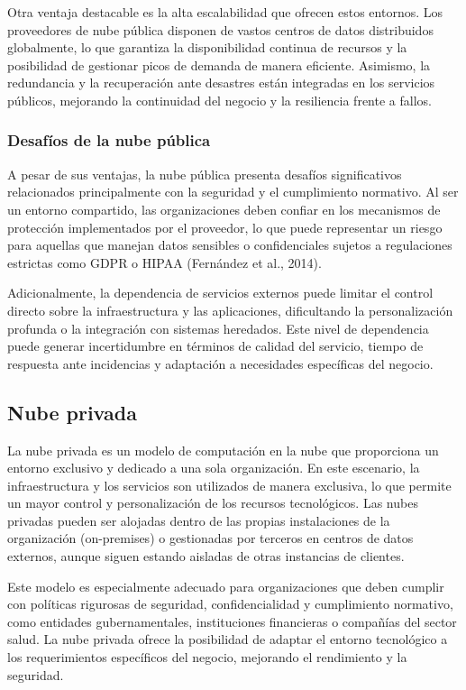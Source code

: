 {                Otra ventaja destacable es la alta escalabilidad que ofrecen estos entornos. Los proveedores de nube p{\'u}blica disponen de vastos centros de datos distribuidos globalmente, lo que garantiza la disponibilidad continua de recursos y la posibilidad de gestionar picos de demanda de manera eficiente. Asimismo, la redundancia y la recuperaci{\'o}n ante desastres est{\'a}n integradas en los servicios p{\'u}blicos, mejorando la continuidad del negocio y la resiliencia frente a fallos.
                
            \subsubsection{Desaf{\'i}os de la nube p{\'u}blica}
                A pesar de sus ventajas, la nube p{\'u}blica presenta desaf{\'i}os significativos relacionados principalmente con la seguridad y el cumplimiento normativo. Al ser un entorno compartido, las organizaciones deben confiar en los mecanismos de protecci{\'o}n implementados por el proveedor, lo que puede representar un riesgo para aquellas que manejan datos sensibles o confidenciales sujetos a regulaciones estrictas como GDPR o HIPAA (Fern{\'a}ndez et al., 2014).
                
                Adicionalmente, la dependencia de servicios externos puede limitar el control directo sobre la infraestructura y las aplicaciones, dificultando la personalizaci{\'o}n profunda o la integraci{\'o}n con sistemas heredados. Este nivel de dependencia puede generar incertidumbre en t{\'e}rminos de calidad del servicio, tiempo de respuesta ante incidencias y adaptaci{\'o}n a necesidades espec{\'i}ficas del negocio.

        \subsection{Nube privada}
            La nube privada es un modelo de computaci{\'o}n en la nube que proporciona un entorno exclusivo y dedicado a una sola organizaci{\'o}n. En este escenario, la infraestructura y los servicios son utilizados de manera exclusiva, lo que permite un mayor control y personalizaci{\'o}n de los recursos tecnol{\'o}gicos. Las nubes privadas pueden ser alojadas dentro de las propias instalaciones de la organizaci{\'o}n (on-premises) o gestionadas por terceros en centros de datos externos, aunque siguen estando aisladas de otras instancias de clientes.
            
            Este modelo es especialmente adecuado para organizaciones que deben cumplir con pol{\'i}ticas rigurosas de seguridad, confidencialidad y cumplimiento normativo, como entidades gubernamentales, instituciones financieras o compañ{\'i}as del sector salud. La nube privada ofrece la posibilidad de adaptar el entorno tecnol{\'o}gico a los requerimientos espec{\'i}ficos del negocio, mejorando el rendimiento y la seguridad.
            
}
